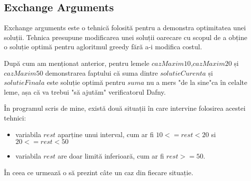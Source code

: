 \subsection{Exchange Arguments}
Exchange arguments este o tehnică folosită pentru a demonstra optimitatea unei soluții. Tehnica presupune modificarea unei soluții oarecare cu scopul de a obține o soluție optimă pentru agloritmul greedy fără a-i modifica costul.\par 
După cum am menționat anterior, pentru lemele $cazMaxim10$,$cazMaxim20$ și $cazMaxim50$ demonstrarea faptului că suma dintre $solutieCurenta$ și $solutieFinala$ este soluție optimă pentru $suma$ nu a mers "de la sine"ca în celalte leme, așa că va trebui "să ajutăm" verificatorul Dafny.\par 
În programul scris de mine, există două situații în care intervine folosirea acestei tehnici: 
\begin{itemize}
	\item variabila $rest$ aparține unui interval, cum ar fi $10 <= rest <20 $ si $20 <= rest < 50$
	\item variabila $rest$ are doar limită inferioară, cum ar fi $rest >= 50$.
\end{itemize}
\par 
În ceea ce urmează o să prezint câte un caz din fiecare situație. 
\par
\vspace{2cm}
